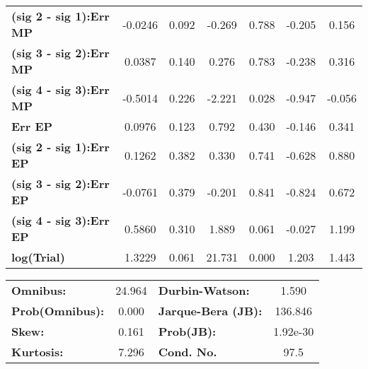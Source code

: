 \begin{center}
\begin{tabular}{lcccccc}
\textbf{(sig 2 - sig 1):Err MP} &      -0.0246  &        0.092     &    -0.269  &         0.788        &       -0.205    &        0.156     \\
\textbf{(sig 3 - sig 2):Err MP} &       0.0387  &        0.140     &     0.276  &         0.783        &       -0.238    &        0.316     \\
\textbf{(sig 4 - sig 3):Err MP} &      -0.5014  &        0.226     &    -2.221  &         0.028        &       -0.947    &       -0.056     \\
\textbf{Err EP}                 &       0.0976  &        0.123     &     0.792  &         0.430        &       -0.146    &        0.341     \\
\textbf{(sig 2 - sig 1):Err EP} &       0.1262  &        0.382     &     0.330  &         0.741        &       -0.628    &        0.880     \\
\textbf{(sig 3 - sig 2):Err EP} &      -0.0761  &        0.379     &    -0.201  &         0.841        &       -0.824    &        0.672     \\
\textbf{(sig 4 - sig 3):Err EP} &       0.5860  &        0.310     &     1.889  &         0.061        &       -0.027    &        1.199     \\
\textbf{log(Trial)}             &       1.3229  &        0.061     &    21.731  &         0.000        &        1.203    &        1.443     \\
\bottomrule
\end{tabular}
\end{center}\begin{center}
\begin{tabular}{lclc}
\toprule
\textbf{Omnibus:}       & 24.964 & \textbf{  Durbin-Watson:     } &    1.590  \\
\textbf{Prob(Omnibus):} &  0.000 & \textbf{  Jarque-Bera (JB):  } &  136.846  \\
\textbf{Skew:}          &  0.161 & \textbf{  Prob(JB):          } & 1.92e-30  \\
\textbf{Kurtosis:}      &  7.296 & \textbf{  Cond. No.          } &     97.5  \\
\bottomrule
\end{tabular}
\end{center}



